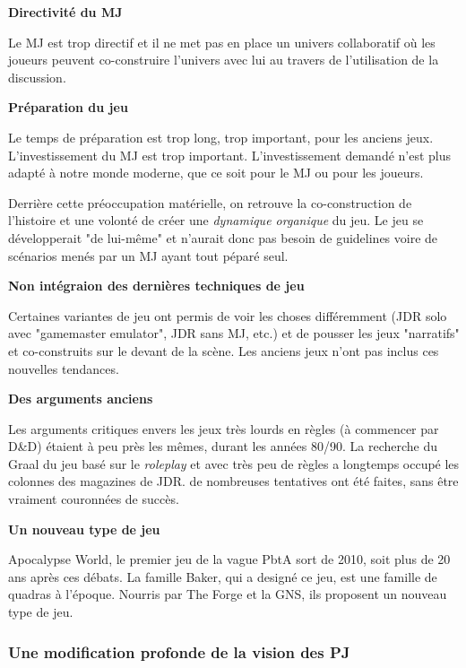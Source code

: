 \documentclass[a4paper, 11pt, twoside]{article}
\begin{document}
\textbf{Directivité du MJ}

Le MJ est trop directif et il ne met pas en place un univers collaboratif où les joueurs peuvent co-construire l'univers avec lui au travers de l'utilisation de la discussion.

\textbf{Préparation du jeu}

Le temps de préparation est trop long, trop important, pour les anciens jeux. L'investissement du MJ est trop important. L'investissement demandé n'est plus adapté à notre monde moderne, que ce soit pour le MJ ou pour les joueurs.

Derrière cette préoccupation matérielle, on retrouve la co-construction de l'histoire et une volonté de créer une \emph{dynamique organique} du jeu. Le jeu se développerait "de lui-même" et n'aurait donc pas besoin de guidelines voire de scénarios menés par un MJ ayant tout péparé seul.

\textbf{Non intégraion des dernières techniques de jeu}

Certaines variantes de jeu ont permis de voir les choses différemment (JDR solo avec "gamemaster emulator", JDR sans MJ, etc.) et de pousser les jeux "narratifs" et co-construits sur le devant de la scène. Les anciens jeux n'ont pas inclus ces nouvelles tendances.

\textbf{Des arguments anciens}

Les arguments critiques envers les jeux très lourds en règles (à commencer par D\&D) étaient à peu près les mêmes, durant les années 80/90. La recherche du Graal du jeu basé sur le \emph{roleplay} et avec très peu de règles a longtemps occupé les colonnes des magazines de JDR. de nombreuses tentatives ont été faites, sans être vraiment couronnées de succès.

\textbf{Un nouveau type de jeu}

Apocalypse World, le premier jeu de la vague PbtA sort de 2010, soit plus de 20 ans après ces débats. La famille Baker, qui a designé ce jeu, est une famille de quadras à l'époque. Nourris par The Forge et la GNS, ils proposent un nouveau type de jeu.

\subsubsection{Une modification profonde de la vision des PJ}
\label{sec:orgd410319}
\end{document}
